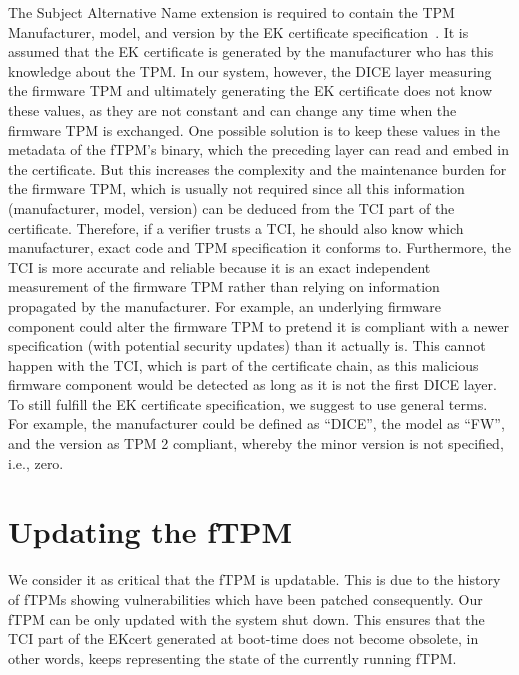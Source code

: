 The Subject Alternative Name extension is required to contain the TPM Manufacturer, model, and version by the EK certificate specification~\cite{tcg-ek}.
It is assumed that the EK certificate is generated by the manufacturer who has this knowledge about the TPM\@.
In our system, however, the DICE layer measuring the firmware TPM and ultimately generating the EK certificate does not know these values, as they are not constant and can change any time when the firmware TPM is exchanged.
One possible solution is to keep these values in the metadata of the fTPM's binary, which the preceding layer can read and embed in the certificate.
But this increases the complexity and the maintenance burden for the firmware TPM, which is usually not required since all this information (manufacturer, model, version) can be deduced from the TCI part of the certificate.
Therefore, if a verifier trusts a TCI, he should also know which manufacturer, exact code and TPM specification it conforms to.
Furthermore, the TCI is more accurate and reliable because it is an exact independent measurement of the firmware TPM rather than relying on information propagated by the manufacturer.
For example, an underlying firmware component could alter the firmware TPM to pretend it is compliant with a newer specification (with potential security updates) than it actually is.
This cannot happen with the TCI, which is part of the certificate chain, as this malicious firmware component would be detected as long as it is not the first DICE layer.
To still fulfill the EK certificate specification, we suggest to use general terms.
For example, the manufacturer could be defined as ``DICE'', the model as ``FW'', and the version as TPM 2 compliant, whereby the minor version is not specified, i.e., zero.


\section{Updating the fTPM}

We consider it as critical that the \ac{fTPM} is updatable. This is due to the history of \acp{fTPM} showing vulnerabilities which have been patched consequently.
Our \ac{fTPM} can be only updated with the system shut down.
This ensures that the TCI part of the EKcert generated at boot-time does not become obsolete, in other words, keeps representing the state of the currently running fTPM\@.

